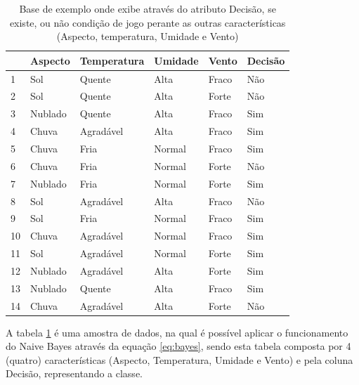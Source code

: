 \begin{table}[!ht]
\centering
\begin{tabular}{|l|l|l|l|l|l|}
\hline \hline 
\rowcolor[HTML]{EFEFEF} 
     & Aspecto   & Temperatura  & Umidade   & Vento    & Decisão \\ \hline
1       & Sol       & Quente        & Alta   & Fraco       & Não \\ \hline                    
2       & Sol       & Quente        & Alta   & Forte       & Não \\ \hline
3       & Nublado   & Quente        & Alta   & Fraco       & Sim \\ \hline                    
4       & Chuva     & Agradável     & Alta   & Fraco       & Sim \\ \hline
5       & Chuva     & Fria          & Normal   & Fraco       & Sim \\ \hline                    
6       & Chuva     & Fria          & Normal   & Forte       & Não \\ \hline
7       & Nublado   & Fria          & Normal   & Forte       & Sim \\ \hline                    
8       & Sol       & Agradável     & Alta   & Fraco       & Não \\ \hline
9       & Sol       & Fria          & Normal   & Fraco       & Sim \\ \hline                    
10       & Chuva    & Agradável     & Normal   & Fraco       & Sim \\ \hline
11       & Sol      & Agradável     & Normal   & Forte       & Sim \\ \hline                    
12       & Nublado  & Agradável     & Alta   & Forte       & Sim \\ \hline
13       & Nublado  & Quente        & Alta   & Fraco       & Sim \\ \hline                    
14       & Chuva    & Agradável     & Alta   & Forte       & Não \\ \hline
\end{tabular}
\caption{Base de exemplo onde exibe através do atributo Decisão, se existe, ou não condição de jogo perante as outras características (Aspecto, temperatura, Umidade e Vento)}
\label{tab:exemploNB}
\end{table}

A tabela \ref{tab:exemploNB} é uma amostra de dados, na qual é possível aplicar o funcionamento do Naive Bayes através da equação \ref{eq:bayes}, sendo esta tabela composta por 4 (quatro) características (Aspecto, Temperatura, Umidade e Vento) e pela coluna Decisão, representando a classe. 

